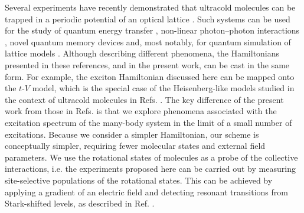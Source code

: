 Several experiments have recently demonstrated that ultracold molecules can be trapped in a periodic potential of an
 optical lattice \cite{umol, umol2, umol3}. Such systems can be used for the study of quantum energy transfer
 \cite{felipe, scholes2006},  non-linear photon--photon interactions \cite{suzanne}, novel quantum memory devices
 \cite{peter-rabl, peter-rabl2} and, most notably, for quantum simulation of lattice models 
\cite{Barnett2006, micheli2006, Brennen2007, Buchler2007, Carr, Carr2, Trefzger2010, Kestner2011, gorshkov, gorshkov2}. 
Although describing different phenomena, the Hamiltonians presented in these references, and in the present work,
 can be cast in the same form. For example, the exciton Hamiltonian discussed here can be mapped onto the $t$-$V$
 model, which is the special case of the Heisenberg-like models studied in the context of ultracold molecules in Refs.
 \cite{micheli2006, Brennen2007, Buchler2007,gorshkov, gorshkov2}. The key difference of the present work from
 those in Refs. \cite{micheli2006, Brennen2007, Buchler2007,gorshkov, gorshkov2} is that we explore phenomena
 associated with the excitation spectrum of the many-body system in the limit of a small number of excitations.
 Because we consider a simpler Hamiltonian, our scheme is conceptually simpler, requiring fewer molecular states and
 external field parameters.  We use the rotational states of molecules as a probe of the collective interactions, i.e. the
 experiments proposed here can be carried out by measuring site-selective populations of the rotational states. This
 can be achieved by applying a gradient of an electric field and detecting resonant transitions from Stark-shifted
 levels, as described in Ref. \cite{demille}.

